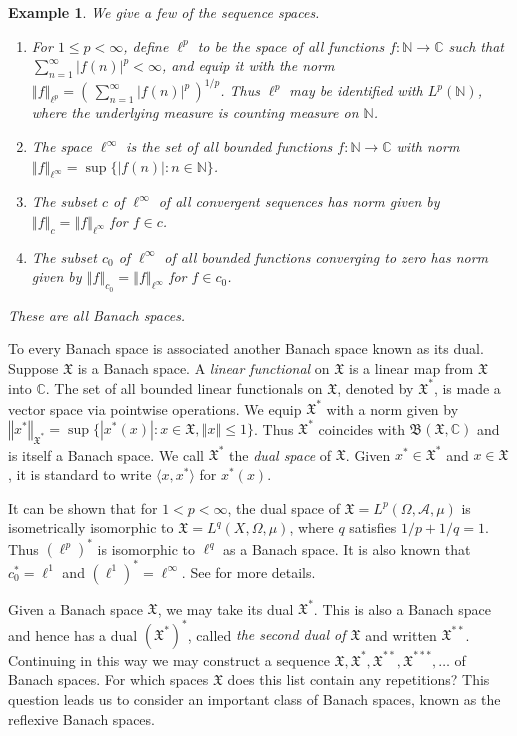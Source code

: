 \documentclass[12pt]{UNSWthesis}
\newcommand{\C}{\mathbb{C}}
\newcommand{\N}{\mathbb{N}}
\newcommand{\B}{\mathfrak{B}}
\newcommand{\X}{\mathfrak{X}}
\newcommand{\A}{\mathcal{A}}
\def\ip<#1,#2>{\langle #1,#2 \rangle}
\def\lp{\ell^p}
\def\norm#1{\left \Vert #1 \right \Vert}
\newtheorem{example}[theorem]{Example}
\numberwithin{equation}{section}
\begin{document}
\begin{example}
We give a few of the sequence spaces. 
\begin{enumerate}
\item For $1\leq p<\infty$, define $\lp$ to be
the space of all functions $f:\N\rightarrow\C$ such that
$\sum_{n=1}^{\infty}|f(n)|^p<\infty$, and equip it with the norm
$\norm{f}_{\lp}=(\,\sum_{n=1}^{\infty}|f(n)|^p\,)^{1/p}$. Thus $\lp$ may be
identified with $L^p(\N)$, where the underlying measure is counting measure on
$\N$.
\item The space $\ell^{\infty}$ is the set of all bounded functions
$f:\N\rightarrow\C$ with norm $\norm{f}_{\ell^{\infty}}=\sup\{|f(n)|:n\in\N\}$.
\item The subset $c$ of $\ell^{\infty}$ of all convergent sequences 
has norm given by $\norm{f}_c=\norm{f}_{\ell^{\infty}}$ for $f\in c$.
\item The subset $c_0$ of $\ell^{\infty}$ of all bounded functions converging to
zero has norm given by $\norm{f}_{c_0}=\norm{f}_{\ell^{\infty}}$ for $f\in c_0$.
\end{enumerate}These are all Banach spaces.
\end{example}

To every Banach space is associated another Banach space known as its dual.
Suppose $\X$ is a Banach space. A {\em linear functional} on $\X$ is a linear
map from $\X$ into $\C$. The set of all bounded linear functionals on $\X$,
denoted
by $\X^*$, is made a vector space via pointwise operations. We equip $\X^*$ with
a norm given by $\norm{x^*}_{\X^*}=\sup\{|x^*(x)|:x\in\X,\norm{x}\leq 1\}$.
Thus $\X^*$ coincides with $\B(\X,\C)$ and is itself a Banach
space. We call $\X^*$ the {\em dual space} of $\X$. Given $x^*\in\X^*$ and
$x\in\X$, it is standard to write
$\ip<x,x^*>$ for $x^*(x)$.

It can be shown that for $1<p<\infty$, the dual space of $\X=L^p(\Omega,\A,\mu)$
is isometrically isomorphic to $\X=L^q(X,\Omega,\mu)$, where $q$ satisfies
$1/p+1/q=1$. Thus $(\lp)^*$ is isomorphic to $\ell^q$ as a Banach space. It is
also known that $c_0^*=\ell^1$ and $(\ell^1)^*=\ell^{\infty}$. See
\cite[Chapter III, \S 5 and \S 11]{Con} for more details.

Given a Banach space $\X$, we may take its dual $\X^*$. This is also a Banach
space and hence has a dual $(\X^*)^*$, called {\em the second dual of $\X$}
and written $\X^{**}$. Continuing in this way we may construct a sequence
$\X,\X^*,\X^{**},\X^{***},\ldots$ of Banach spaces. For which
spaces $\X$ does this list contain any repetitions? This question leads us to
consider an important class of Banach spaces, known as the reflexive Banach
spaces.
\end{document}
